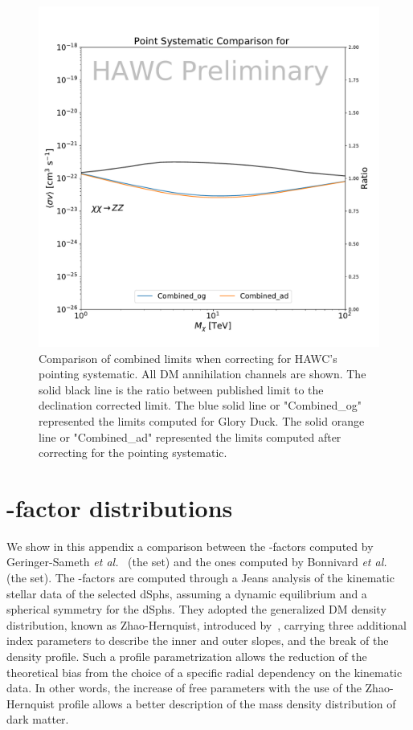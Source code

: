 \begin{figure}[h]
{    \includegraphics[scale=0.21]{figures/glory_duck/hawc/PointingSystematic_GD_Combined_zz.pdf}
    \caption{Comparison of combined limits when correcting for HAWC's pointing systematic. All DM annihilation channels are shown. The solid black line is the ratio between published limit to the declination corrected limit. The blue solid line or "Combined\_og" represented the limits computed for Glory Duck. The solid orange line or "Combined\_ad" represented the limits computed after correcting for the pointing systematic.}
}
\label{fig:pointing_systematic}
\end{figure}

\section{\J-factor distributions}\label{sec:gd_jfactor_systematic}

We show in this appendix a comparison between the \J-factors computed by Geringer-Sameth \emph{et al.}~\cite{Geringer-Sameth:2014yza} (the \GS set) and the ones computed by Bonnivard \emph{et al.}~\cite{Bonnivard:2014kza, Bonnivard:2015xpq} (the \B set).
%
The \GS \J-factors are computed through a Jeans analysis of the kinematic stellar data of the  selected dSphs, assuming a dynamic equilibrium and a spherical symmetry for the dSphs.
They adopted the generalized DM density distribution, known as Zhao-Hernquist, introduced by~\cite{Zhao:1995cp}, carrying three additional index parameters to describe the inner and outer slopes, and the break of the density profile.
Such a profile parametrization allows the reduction of the theoretical bias from the choice of a specific radial dependency on the kinematic data.
In other words, the increase of free parameters with the use of the  Zhao-Hernquist profile allows a better description of the mass density distribution of dark matter.

